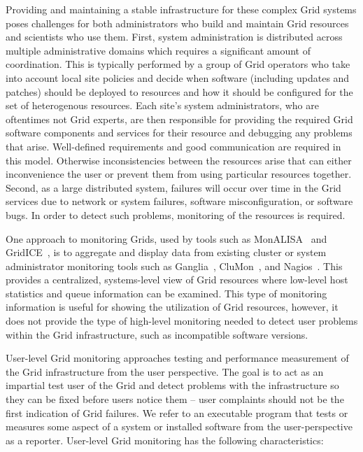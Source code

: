 \documentclass[times, 10pt,twocolumn]{article}
\begin{document}
Providing and maintaining a stable infrastructure for these complex 
Grid systems poses challenges for both administrators who build and
maintain Grid resources and scientists who use them.  First, system
administration is distributed across multiple administrative domains which
requires a significant amount of coordination.  This is typically performed by
a group of Grid operators who take into account local site policies 
and decide when software (including updates and patches) should be deployed to
resources and how it should be configured for the set of heterogenous
resources.  Each site's system administrators, who are oftentimes not Grid
experts, are then responsible for providing the required Grid software
components and services for their resource and debugging any problems that
arise.  Well-defined requirements and good communication are required in this
model.  Otherwise inconsistencies between the resources arise that can either
inconvenience the user or prevent them from using particular resources
together.  Second, as a large distributed system, failures will occur over
time in the Grid services due to network or system failures, software
misconfiguration, or software bugs.  In order to detect such problems, 
monitoring of the resources is required.  

One approach to monitoring Grids, used by tools such as
MonALISA~\cite{monalisa} and GridICE~\cite{gridice}, is to aggregate and
display data from existing cluster or system administrator monitoring tools
such as Ganglia~\cite{ganglia}, CluMon~\cite{clumon}, and
Nagios~\cite{nagios}.  This provides a centralized, systems-level view of Grid
resources where low-level host statistics and queue information can be
examined.  This type of monitoring information is useful for showing the
utilization of Grid resources, however, it does not provide the type of
high-level monitoring needed to detect user problems within the Grid
infrastructure, such as incompatible software versions.  

User-level Grid monitoring approaches testing and performance measurement of
the Grid infrastructure from the user perspective.  The goal is to act as an
impartial test user of the Grid and detect problems with the infrastructure so
they can be fixed before users notice them -- user complaints should not be
the first indication of Grid failures.  We refer to an executable program that
tests or measures some aspect of a system or installed software from the
user-perspective as a reporter.  User-level Grid monitoring has the following
characteristics:
\end{document}
